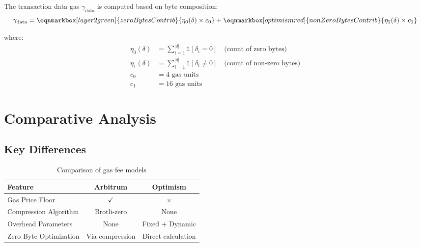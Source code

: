 \documentclass[letterpaper,10pt]{article} %
\begin{document}
The transaction data gas $\gamma_{\text{data}}$ is computed based on byte composition:
\begin{equation}
    \label{eq:optimism_data_gas_calc}
    \gamma_{\text{data}} = 
    \eqnmarkbox[layer2green]{zeroBytesContrib}{\eta_0(\delta) \times c_0} + 
    \eqnmarkbox[optimismred]{nonZeroBytesContrib}{\eta_1(\delta) \times c_1}
\end{equation}

where:
\begin{align}
\eta_0(\delta) &= \sum_{i=1}^{|\delta|} \mathbb{1}[\delta_i = 0] \quad \text{(count of zero bytes)} \\
\eta_1(\delta) &= \sum_{i=1}^{|\delta|} \mathbb{1}[\delta_i \neq 0] \quad \text{(count of non-zero bytes)} \\
c_0 &= 4 \text{ gas units} \\
c_1 &= 16 \text{ gas units}
\end{align}

\section{Comparative Analysis} %

\subsection{Key Differences} %

\begin{table}[h]
\centering
\begin{tabular}{l|c|c}
\hline
\textbf{Feature} & \textbf{Arbitrum} & \textbf{Optimism} \\
\hline
Gas Price Floor & $\checkmark$ & $\times$ \\
Compression Algorithm & Brotli-zero & None \\
Overhead Parameters & None & Fixed + Dynamic \\
Zero Byte Optimization & Via compression & Direct calculation \\
\hline
\end{tabular}
\caption{Comparison of gas fee models}
\end{table}
\end{document}
